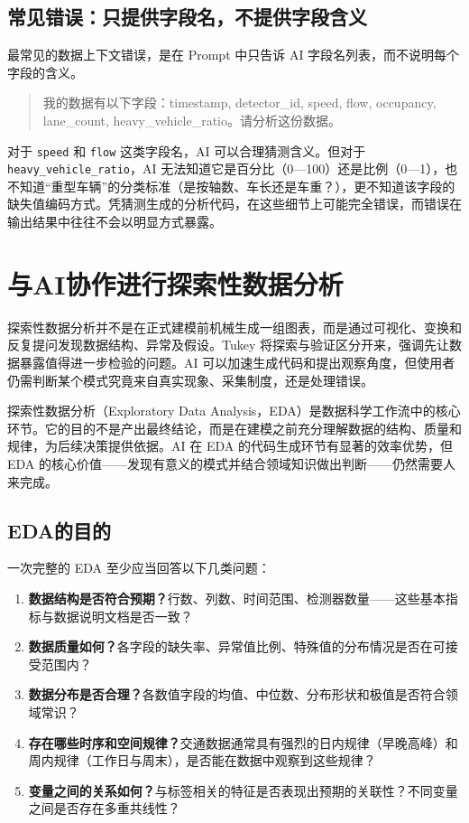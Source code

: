 \subsection{常见错误：只提供字段名，不提供字段含义}

最常见的数据上下文错误，是在 Prompt 中只告诉 AI 字段名列表，而不说明每个字段的含义。

\begin{quote}
我的数据有以下字段：timestamp, detector\_id, speed, flow, occupancy, lane\_count, heavy\_vehicle\_ratio。请分析这份数据。
\end{quote}

对于 \texttt{speed} 和 \texttt{flow} 这类字段名，AI 可以合理猜测含义。但对于 \texttt{heavy\_vehicle\_ratio}，AI 无法知道它是百分比（0—100）还是比例（0—1），也不知道“重型车辆”的分类标准（是按轴数、车长还是车重？），更不知道该字段的缺失值编码方式。凭猜测生成的分析代码，在这些细节上可能完全错误，而错误在输出结果中往往不会以明显方式暴露。

\section{与AI协作进行探索性数据分析}

探索性数据分析并不是在正式建模前机械生成一组图表，而是通过可视化、变换和反复提问发现数据结构、异常及假设。Tukey 将探索与验证区分开来，强调先让数据暴露值得进一步检验的问题\cite{tukey1977exploratory}。AI 可以加速生成代码和提出观察角度，但使用者仍需判断某个模式究竟来自真实现象、采集制度，还是处理错误。
\label{sec:eda}

探索性数据分析（Exploratory Data Analysis，EDA）是数据科学工作流中的核心环节。它的目的不是产出最终结论，而是在建模之前充分理解数据的结构、质量和规律，为后续决策提供依据。AI 在 EDA 的代码生成环节有显著的效率优势，但 EDA 的核心价值——发现有意义的模式并结合领域知识做出判断——仍然需要人来完成。

\subsection{EDA的目的}

一次完整的 EDA 至少应当回答以下几类问题：

\begin{enumerate}
  \item \textbf{数据结构是否符合预期？}行数、列数、时间范围、检测器数量——这些基本指标与数据说明文档是否一致？
  \item \textbf{数据质量如何？}各字段的缺失率、异常值比例、特殊值的分布情况是否在可接受范围内？
  \item \textbf{数据分布是否合理？}各数值字段的均值、中位数、分布形状和极值是否符合领域常识？
  \item \textbf{存在哪些时序和空间规律？}交通数据通常具有强烈的日内规律（早晚高峰）和周内规律（工作日与周末），是否能在数据中观察到这些规律？
  \item \textbf{变量之间的关系如何？}与标签相关的特征是否表现出预期的关联性？不同变量之间是否存在多重共线性？
\end{enumerate}

